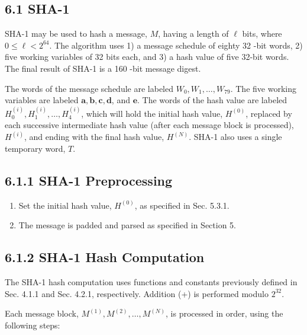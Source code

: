 \subsection*{6.1 SHA-1}

SHA-1 may be used to hash a message, \(M\), having a length of \(\ell\) bits, where \(0 \leq \ell<2^{64}\). The algorithm uses 1) a message schedule of eighty 32 -bit words, 2) five working variables of 32 bits each, and 3) a hash value of five 32-bit words. The final result of SHA-1 is a 160 -bit message digest.

The words of the message schedule are labeled \(W_{0}, W_{1}, \ldots, W_{79}\). The five working variables are labeled \(\boldsymbol{a}, \boldsymbol{b}, \boldsymbol{c}, \boldsymbol{d}\), and \(\boldsymbol{e}\). The words of the hash value are labeled \(H_{0}^{(i)}, H_{1}^{(i)}, \ldots, H_{4}^{(i)}\), which will hold the initial hash value, \(H^{(0)}\), replaced by each successive intermediate hash value (after each message block is processed), \(H^{(i)}\), and ending with the final hash value, \(H^{(N)}\). SHA-1 also uses a single temporary word, \(T\).

\subsection*{6.1.1 SHA-1 Preprocessing}

\begin{enumerate}
  \item Set the initial hash value, \(H^{(0)}\), as specified in Sec. 5.3.1.
  \item The message is padded and parsed as specified in Section 5.
\end{enumerate}

\subsection*{6.1.2 SHA-1 Hash Computation}

The SHA-1 hash computation uses functions and constants previously defined in Sec. 4.1.1 and Sec. 4.2.1, respectively. Addition (+) is performed modulo \(2^{32}\).

Each message block, \(M^{(1)}, M^{(2)}, \ldots, M^{(N)}\), is processed in order, using the following steps:

